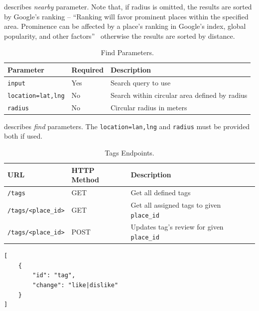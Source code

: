  describes \textit{nearby} parameter. Note that, if radius is omitted, the results are sorted by Google's ranking -- ``Ranking will favor prominent places within the specified area. Prominence can be affected by a place's ranking in Google's index, global popularity, and other factors''~\cite{google-places-api-nearby-req} otherwise the results are sorted by distance. 
\begin{table}[ht]
\centering
\begin{tabularx}{\textwidth}{|l|l|X|}
\hline
\textbf{Parameter} & \textbf{Required} & \textbf{Description} \\ \hline
\verb|input| & Yes & Search query to use \\ \hline
\verb|location=lat,lng| & No & Search within circular area defined by radius \\ \hline
\verb|radius| & No & Circular radius in meters\\ \hline
\end{tabularx}
\caption{Find Parameters.}
\label{table:cta-find-params}
\end{table}

 describes \textit{find} parameters. The \verb|location=lan,lng| and \verb|radius| must be provided both if used. 
\begin{table}[ht]
\centering
\begin{tabularx}{\textwidth}{|l|l|X|}
\hline
\textbf{URL} & \textbf{HTTP Method} & \textbf{Description} \\ \hline
\verb|/tags| & GET & Get all defined tags \\ \hline
\verb|/tags/<place_id>| & GET & Get all assigned tags to given \verb|place_id| \\ \hline
\verb|/tags/<place_id>| & POST & Updates tag's review for given \verb|place_id| \\ \hline
\end{tabularx}
\caption{Tags Endpoints.}
\label{table:cta-tags}
\end{table}

\begin{listing}[ht]
\begin{verbatim}
[
    {
        "id": "tag",
        "change": "like|dislike"
    }
]
\end{verbatim}
\caption{Tag Update Content Example.}
\label{listing:tag-update-post}
\end{listing}

